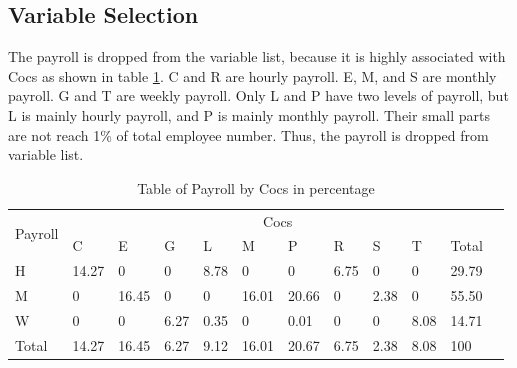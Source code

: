 \subsection{Variable Selection}
The payroll is dropped from the variable list, because it is highly associated with Cocs as shown in table \ref{tab: freq1}. C and R are hourly payroll. E, M, and S are monthly payroll. G and T are weekly payroll. Only L and P have two levels of payroll, but L is mainly hourly payroll, and P is mainly monthly payroll. Their small parts are not reach 1\% of total employee number. Thus, the payroll is dropped from variable list.          
\begin{table}[htbp]
	\centering
	\small
	\renewcommand{\arraystretch}{1.5}
	\caption{ Table of Payroll by Cocs in percentage }
	\begin{tabular}{llllllllllll}
		\hline
		\multirow{2}[4]{*}{Payroll} & \multicolumn{10}{c}{Cocs} \\ \cline{2-11}
		
	
		& C     & E     & G     & L     & M     & P     & R     & S     & T     & Total \\ \hline
		H     & 14.27 & 0     & 0     & 8.78  & 0     & 0     & 6.75  & 0     & 0     & 29.79 \\
		M     & 0     & 16.45 & 0     & 0     & 16.01 & 20.66 & 0     & 2.38  & 0     & 55.50 \\
		W     & 0     & 0     & 6.27  & 0.35  & 0     & 0.01  & 0     & 0     & 8.08  & 14.71 \\
		Total & 14.27 & 16.45 & 6.27  & 9.12  & 16.01 & 20.67 & 6.75  & 2.38  & 8.08  & 100 \\
		\hline
	\end{tabular}%
	\label{tab: freq1}%
\end{table}%


